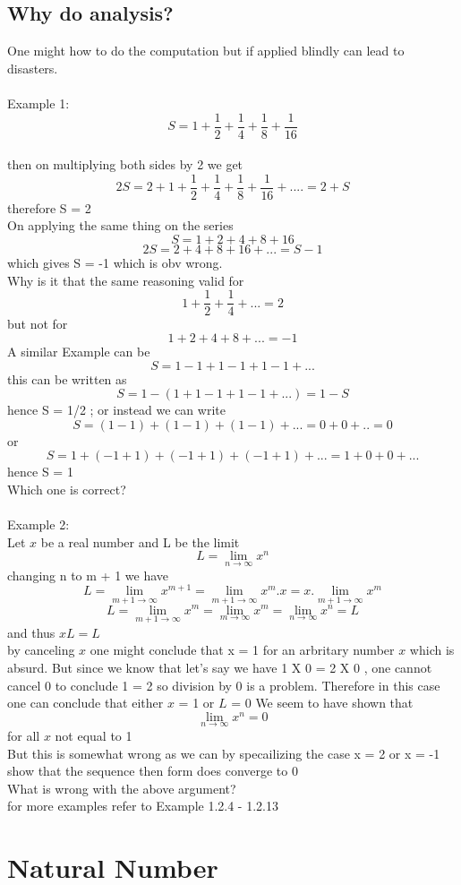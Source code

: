 \documentclass{article}
\begin{document}
\subsection*{Why do analysis?}
One might how to do the computation but if applied blindly can lead to disasters.
\\\\
Example 1: $$S = 1  + \frac{1}{2} + \frac{1}{4} + \frac{1}{8} + \frac{1}{16}$$
\\ then on multiplying both sides by 2 we get
\\
$$2S = 2+ 1  + \frac{1}{2} + \frac{1}{4} + \frac{1}{8} + \frac{1}{16} + ....=2+S$$
therefore S = 2
\\On applying the same thing on the series $$S=1+2+4+8+16$$
$$2S=2+4+8+16+...=S-1$$
which gives S = -1
which is obv wrong.
\\Why is it that the same reasoning valid for $$1 + \frac{1}{2}+\frac{1}{4}+...=2$$ but not for $$1+2+4+8+...=-1$$
A similar Example can be $$S=1-1+1-1+1-1+...$$
this can be written as $$S=1-(1+1-1+1-1+...)=1-S$$
hence S = 1/2 ; or instead we can write
$$S=(1-1)+(1-1)+(1-1)+...=0+0+..=0$$
or $$S=1+(-1+1)+(-1+1)+(-1+1)+...=1+0+0+...$$
hence S = 1
\\Which one is correct?
\\\\
Example 2:
\\Let $x$ be a real number and L be the limit
$$L=\lim_{n\to{\infty}}x^{n}$$
changing n to m + 1 we have
$$L=\lim_{m+1\to{\infty}}x^{m+1} =\lim_{m+1\to{\infty}}x^{m}.x=x.\lim_{m+1\to{\infty}}x^{m}$$
$$L=\lim_{m+1\to{\infty}}x^{m}=\lim_{m\to{\infty}}x^{m}=\lim_{n\to{\infty}}x^{n}=L$$
and thus $xL = L$
\\
by canceling $x$ one might conclude that x = 1 for an arbritary number $x$ which is absurd.
But since we know that let's say we have 1 X 0 = 2 X 0 , one cannot cancel 0 to conclude 1 = 2 so division by 0 is a problem.
Therefore in this case one can conclude that either $x$ = 1 or $L$ = 0
We seem to have shown that $$\lim_{n\to{\infty}}x^{n}=0$$ for all $x$ not equal to 1
\\But this is somewhat wrong as we can by specailizing the case x = 2 or x = -1 show that the sequence then form does converge to 0
\\What is wrong with the above argument?
\\for more examples refer to Example 1.2.4 - 1.2.13
\section*{Natural Number}
\end{document}
